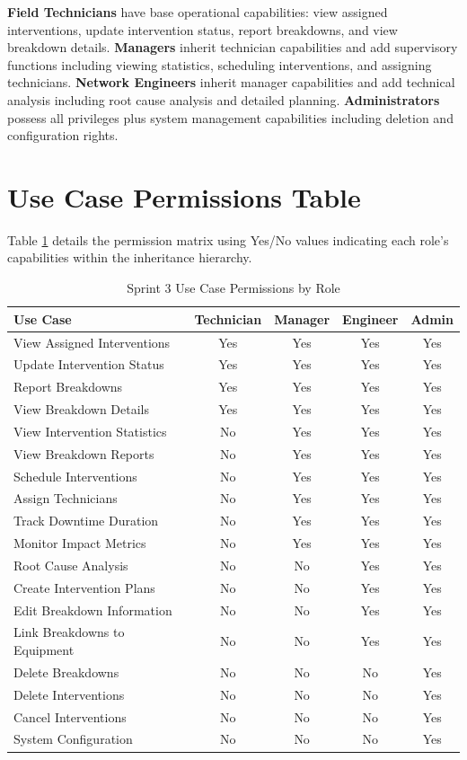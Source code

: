 \textbf{Field Technicians} have base operational capabilities: view assigned interventions, update intervention status, report breakdowns, and view breakdown details. \textbf{Managers} inherit technician capabilities and add supervisory functions including viewing statistics, scheduling interventions, and assigning technicians. \textbf{Network Engineers} inherit manager capabilities and add technical analysis including root cause analysis and detailed planning. \textbf{Administrators} possess all privileges plus system management capabilities including deletion and configuration rights.

\section{Use Case Permissions Table}

Table \ref{tab:sprint3-permissions} details the permission matrix using Yes/No values indicating each role's capabilities within the inheritance hierarchy.

\begin{table}[H]
\centering
\scriptsize
\caption{Sprint 3 Use Case Permissions by Role}
\label{tab:sprint3-permissions}
\begin{tabular}{|p{5.5cm}|c|c|c|c|}
\hline
\textbf{Use Case} & \textbf{Technician} & \textbf{Manager} & \textbf{Engineer} & \textbf{Admin} \\
\hline
View Assigned Interventions & Yes & Yes & Yes & Yes \\
\hline
Update Intervention Status & Yes & Yes & Yes & Yes \\
\hline
Report Breakdowns & Yes & Yes & Yes & Yes \\
\hline
View Breakdown Details & Yes & Yes & Yes & Yes \\
\hline
View Intervention Statistics & No & Yes & Yes & Yes \\
\hline
View Breakdown Reports & No & Yes & Yes & Yes \\
\hline
Schedule Interventions & No & Yes & Yes & Yes \\
\hline
Assign Technicians & No & Yes & Yes & Yes \\
\hline
Track Downtime Duration & No & Yes & Yes & Yes \\
\hline
Monitor Impact Metrics & No & Yes & Yes & Yes \\
\hline
Root Cause Analysis & No & No & Yes & Yes \\
\hline
Create Intervention Plans & No & No & Yes & Yes \\
\hline
Edit Breakdown Information & No & No & Yes & Yes \\
\hline
Link Breakdowns to Equipment & No & No & Yes & Yes \\
\hline
Delete Breakdowns & No & No & No & Yes \\
\hline
Delete Interventions & No & No & No & Yes \\
\hline
Cancel Interventions & No & No & No & Yes \\
\hline
System Configuration & No & No & No & Yes \\
\hline
\end{tabular}
\end{table}

